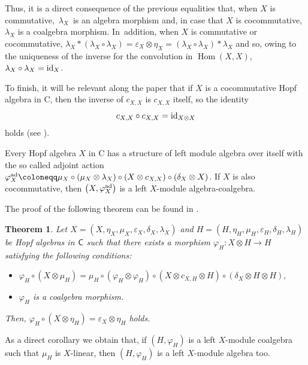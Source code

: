 \documentclass[10pt,a4paper]{amsart}
\numberwithin{equation}{section}
\newtheorem{Theorem}{Theorem}[section]
\DeclareMathOperator{\Hom}{Hom}
\begin{document}
\begin{Definition}
Thus, it is a direct consequence of the previous equalities that, when $X$ is commutative,~$\lambda_{X}$~is an algebra morphism and, in case that $X$ is cocommutative, $\lambda_{X}$ is a coalgebra morphism. In~addition, when $X$ is commutative or cocommutative, $\lambda_{X}\ast(\lambda_{X}\circ\lambda_{X})=\varepsilon_{X}\otimes\eta_{X}=(\lambda_{X}\circ\lambda_{X})\ast\lambda_{X}$ and so, owing to the uniqueness of the inverse for the convolution in $\Hom(X,X)$, $\lambda_{X}\circ\lambda_{X}={\rm id}_{X}$.

To finish, it will be relevant along the paper that if $X$ is a cocommutative Hopf algebra in {\sf C}, then the inverse of $c_{X,X}$ is $c_{X,X}$ itself, so the identity
\begin{equation}
\label{ccb}
c_{X,X}\circ c_{X,X}={\rm id}_{X\otimes X}
\end{equation}
holds (see \cite[Corollary 5]{Sch}).
\end{Definition}
\begin{Remark}
Every Hopf algebra $X$ in {\sf C} has a structure of left module algebra over itself with the so called adjoint action $\varphi_{X}^{{\rm ad}}\coloneqq \mu_{X}\circ(\mu_{X}\otimes\lambda_{X})\circ(X\otimes c_{X,X})\circ(\delta_{X}\otimes X)$. If $X$ is also cocommutative, then $\bigl(X,\varphi_{X}^{{\rm ad}}\bigr)$ is a left $X$-module algebra-coalgebra.
\end{Remark}
The proof of the following theorem can be found in \cite[Theorem 1.8]{FGR}.
\begin{Theorem}\label{th.interest}\samepage
Let $X=(X,\eta_{X},\mu_{X},\varepsilon_{X},\delta_{X},\lambda_{X})$ and $H=(H,\eta_{H},\mu_{H},\varepsilon_{H},\delta_{H},\lambda_{H})$ be Hopf algebras in $\sf{C}$ such that there exists a morphism $\varphi_{H}\colon X\otimes H\rightarrow H$ satisfying the following conditions:
\begin{itemize}\itemsep=0pt
\item[$(i)$] $\varphi_{H}\circ(X\otimes\mu_{H})=\mu_{H}\circ(\varphi_{H}\otimes\varphi_{H})\circ(X\otimes c_{X,H}\otimes H)\circ(\delta_{X}\otimes H\otimes H),$
\item[$(ii)$] $\varphi_{H}$ is a coalgebra morphism.
\end{itemize}
Then, $\varphi_{H}\circ(X\otimes\eta_{H})=\varepsilon_{X}\otimes\eta_{H}$ holds.
\end{Theorem}
As a direct corollary we obtain that, if $(H,\varphi_{H})$ is a left $X$-module coalgebra such that $\mu_{H}$ is $X$-linear, then $(H,\varphi_{H})$ is a left $X$-module algebra too.
\end{document}
